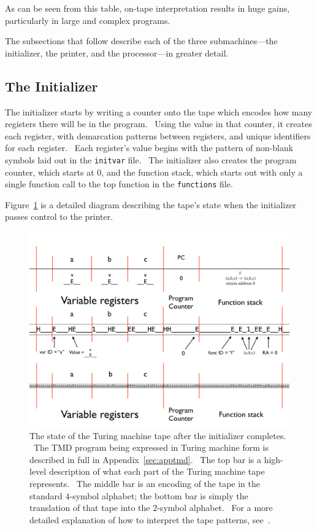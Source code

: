 \documentclass[11pt]{article}
\begin{document}
As can be seen from this table, on-tape interpretation results in huge gains, particularly in large and complex programs.

The subsections that follow describe each of the three submachines---the initializer, the printer, and the processor---in greater detail.

\subsection{The Initializer}

The initializer starts by writing a counter onto the tape which encodes how many registers there will be in the program. \ Using the value in that counter, it creates each register, with demarcation patterns between registers, and unique identifiers for each register. \ Each register's value begins with the pattern of non-blank symbols laid out in the \texttt{initvar} file. \ The initializer also creates the program counter, which starts at 0, and the function stack, which starts out with only a single function call to the top function in the \texttt{functions} file.

Figure~\ref{fig:postinit} is a detailed diagram describing the tape's state when the initializer passes control to the printer.

\begin{figure}
\begin{center}
\includegraphics[scale=0.42]{figs/postinit.png}
\caption{The state of the Turing machine tape after the initializer completes. \ The TMD program being expressed in Turing machine form is described in full in Appendix~\ref{sec:apptmd}. \ The top bar is a high-level description of what each part of the Turing machine tape represents. \ The middle bar is an encoding of the tape in the standard $4$-symbol alphabet; the bottom bar is simply the translation of that tape into the $2$-symbol alphabet. \ For a more detailed explanation of how to interpret the tape patterns, see~\cite{github}. \label{fig:postinit}}
\end{center}
\end{figure}
\end{document}
